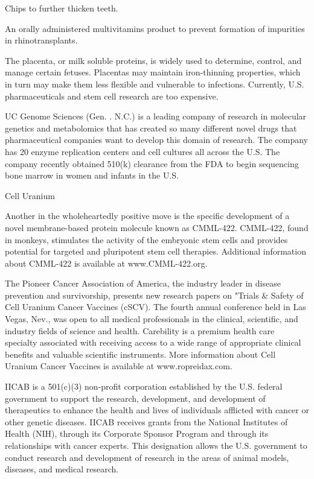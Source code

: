 \documentclass{article}
\begin{document}
Chips to further thicken teeth.

An orally administered multivitamins product to prevent formation of impurities in rhinotransplants.

The placenta, or milk soluble proteins, is widely used to determine, control, and manage certain fetuses. Placentas may maintain iron-thinning properties, which in turn may make them less flexible and vulnerable to infections. Currently, U.S. pharmaceuticals and stem cell research are too expensive.

UC Genome Sciences (Gen. . N.C.) is a leading company of research in molecular genetics and metabolomics that has created so many different novel drugs that pharmaceutical companies want to develop this domain of research. The company has 20 enzyme replication centers and cell cultures all across the U.S. The company recently obtained 510(k) clearance from the FDA to begin sequencing bone marrow in women and infants in the U.S.

Cell Uranium

Another in the wholeheartedly positive move is the specific development of a novel membrane-based protein molecule known as CMML-422. CMML-422, found in monkeys, stimulates the activity of the embryonic stem cells and provides potential for targeted and pluripotent stem cell therapies. Additional information about CMML-422 is available at www.CMML-422.org.

The Pioneer Cancer Association of America, the industry leader in disease prevention and survivorship, presents new research papers on "Trials \& Safety of Cell Uranium Cancer Vaccines (cSCV). The fourth annual conference held in Las Vegas, Nev., was open to all medical professionals in the clinical, scientific, and industry fields of science and health. Carebility is a premium health care specialty associated with receiving access to a wide range of appropriate clinical benefits and valuable scientific instruments. More information about Cell Uranium Cancer Vaccines is available at www.ropreidax.com.

IICAB is a 501(c)(3) non-profit corporation established by the U.S. federal government to support the research, development, and development of therapeutics to enhance the health and lives of individuals afflicted with cancer or other genetic diseases. IICAB receives grants from the National Institutes of Health (NIH), through its Corporate Sponsor Program and through its relationships with cancer experts. This designation allows the U.S. government to conduct research and development of research in the areas of animal models, diseases, and medical research.
\end{document}
